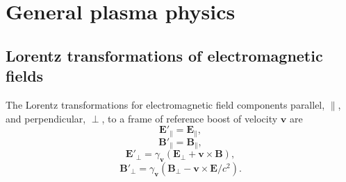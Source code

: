 %

\chapter{\label{app:1-basics}General plasma physics}

\minitoc

\section{Lorentz transformations of electromagnetic fields}\label{sec:app_lorentzEM}
The Lorentz transformations for electromagnetic field components parallel, $\parallel$, and perpendicular, $\perp$, to a frame of reference boost of velocity $\mathbf{v}$ are \cite{steaneRelativityMadeRelatively2012}
\begin{equation}\label{eq:app-maxwell_transformation}
	\mathbf{E}'_\parallel = \mathbf{E}_\parallel,
\end{equation}
\begin{equation}
	\mathbf{B}'_\parallel = \mathbf{B}_\parallel,
\end{equation}
\begin{equation}
	\mathbf{E}'_\perp = \gamma_\mathbf{v}(\mathbf{E}_\perp + \mathbf{v} \times \mathbf{B}),
\end{equation}
\begin{equation}
	\mathbf{B}'_\perp = \gamma_\mathbf{v}(\mathbf{B}_\perp - \mathbf{v} \times \mathbf{E}/c^2).
\end{equation}

